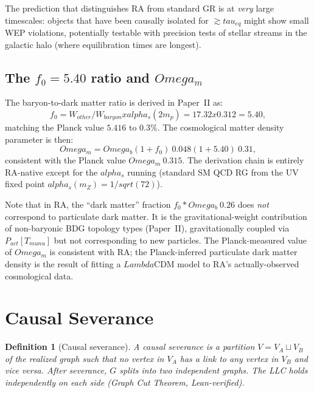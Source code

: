\documentclass[11pt]{article}
\def\Lambda{Lambda}%
\def\Omega{Omega}%
\def\mu{mu}%
\def\alpha{alpha}%
\def\tau{tau}%
\def\nu{nu}%
\def\mathrm#1{#1}%
\def\sqrt#1{sqrt(#1)}%
\def\frac#1#2{#1/#2}%
\def\cdot{*}%
\def\times{x}%
\def\approx{~}%
\newtheorem{definition}{Definition}
\begin{document}
The prediction that distinguishes RA from standard GR is at \emph{very} large timescales: objects that have been causally isolated for $\gtrsim \tau_{\mathrm{eq}}$ might show small WEP violations, potentially testable with precision tests of stellar streams in the galactic halo (where equilibration times are longest).

\subsection{The $f_0 = 5.40$ ratio and $\Omega_m$}

The baryon-to-dark matter ratio is derived in Paper~II as:
\begin{equation}
f_0 = \frac{W_{\mathrm{other}}}{W_{\mathrm{baryon}}} \times \alpha_s(2m_p) = 17.32 \times 0.312 = 5.40,
\end{equation}
matching the Planck value $5.416$ to $0.3\%$. The cosmological matter density parameter is then:
\begin{equation}
\Omega_m = \Omega_b(1 + f_0) \approx 0.048(1 + 5.40) \approx 0.31,
\end{equation}
consistent with the Planck value $\Omega_m \approx 0.315$. The derivation chain is entirely RA-native except for the $\alpha_s$ running (standard SM QCD RG from the UV fixed point $\alpha_s(m_Z) = 1/\sqrt{72}$).

Note that in RA, the ``dark matter'' fraction $f_0 \cdot \Omega_b \approx 0.26$ does \emph{not} correspond to particulate dark matter. It is the gravitational-weight contribution of non-baryonic BDG topology types (Paper~II), gravitationally coupled via $P_{\mathrm{act}}[T_{\mu\nu}]$ but not corresponding to new particles. The Planck-measured value of $\Omega_m$ is consistent with RA; the Planck-inferred particulate dark matter density is the result of fitting a $\Lambda$CDM model to RA's actually-observed cosmological data.

\section{Causal Severance}
\label{sec:severance}

\begin{definition}[Causal severance]
A causal severance is a partition $V=V_A\sqcup V_B$ of the realized graph such that no vertex in $V_A$ has a link to any vertex in $V_B$ and vice versa. After severance, $G$ splits into two independent graphs. The LLC holds independently on each side (Graph Cut Theorem, Lean-verified).
\end{definition}
\end{document}
